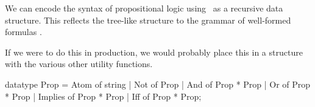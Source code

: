 \begin{node}\label{prop-000G}%
We can encode the syntax of propositional logic using \SML\ as a
recursive data structure. This reflects the tree-like structure to the
grammar of well-formed formulas .

If we were to do this in production, we would probably place this in a
structure with the various other utility functions.

\begin{sml}
datatype Prop = Atom of string
                | Not of Prop
                | And of Prop * Prop
                | Or of Prop * Prop
                | Implies of Prop * Prop
                | Iff of Prop * Prop;
\end{sml}
\end{node}
